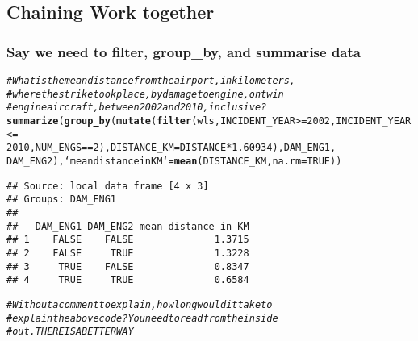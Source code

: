 \documentclass{beamer}\usepackage[]{graphicx}\usepackage[]{color}
\makeatletter
\newcommand{\hlnum}[1]{\textcolor[rgb]{0.686,0.059,0.569}{#1}}%
\newcommand{\hlcom}[1]{\textcolor[rgb]{0.678,0.584,0.686}{\textit{#1}}}%
\newcommand{\hlopt}[1]{\textcolor[rgb]{0,0,0}{#1}}%
\newcommand{\hlstd}[1]{\textcolor[rgb]{0.345,0.345,0.345}{#1}}%
\newcommand{\hlkwc}[1]{\textcolor[rgb]{0.333,0.667,0.333}{#1}}%
\newcommand{\hlkwd}[1]{\textcolor[rgb]{0.737,0.353,0.396}{\textbf{#1}}}%
\newenvironment{kframe}{%
 \def\at@end@of@kframe{}%
 \ifinner\ifhmode%
  \def\at@end@of@kframe{\end{minipage}}%
  \begin{minipage}{\columnwidth}%
 \fi\fi%
 \def\FrameCommand##1{\hskip\@totalleftmargin \hskip-\fboxsep
 \colorbox{shadecolor}{##1}\hskip-\fboxsep
     \hskip-\linewidth \hskip-\@totalleftmargin \hskip\columnwidth}%
 \MakeFramed {\advance\hsize-\width
   \@totalleftmargin\z@ \linewidth\hsize
   \@setminipage}}%
 {\par\unskip\endMakeFramed%
 \at@end@of@kframe}
\newenvironment{knitrout}{}{} %
\makeatother
\begin{document}
\subsection{Chaining Work together}%
\begin{frame}[fragile]
  \frametitle{Say we need to filter, group\_by, and
  summarise data}
\begin{knitrout}\footnotesize
{}\color{fgcolor}\begin{kframe}
\begin{alltt}
\hlcom{# What is the mean distance from the airport, in kilometers,}
\hlcom{# where the strike took place, by damage to engine, on twin}
\hlcom{# engine aircraft, between 2002 and 2010, inclusive?}
\hlkwd{summarize}\hlstd{(}\hlkwd{group_by}\hlstd{(}\hlkwd{mutate}\hlstd{(}\hlkwd{filter}\hlstd{(wls, INCIDENT_YEAR} \hlopt{>=} \hlnum{2002}\hlstd{, INCIDENT_YEAR} \hlopt{<=}
    \hlnum{2010}\hlstd{, NUM_ENGS} \hlopt{==} \hlnum{2}\hlstd{),} \hlkwc{DISTANCE_KM} \hlstd{= DISTANCE} \hlopt{*} \hlnum{1.60934}\hlstd{), DAM_ENG1,}
    \hlstd{DAM_ENG2),} \hlkwc{`mean distance in KM`} \hlstd{=} \hlkwd{mean}\hlstd{(DISTANCE_KM,} \hlkwc{na.rm} \hlstd{=} \hlnum{TRUE}\hlstd{))}
\end{alltt}
\begin{verbatim}
## Source: local data frame [4 x 3]
## Groups: DAM_ENG1
## 
##   DAM_ENG1 DAM_ENG2 mean distance in KM
## 1    FALSE    FALSE              1.3715
## 2    FALSE     TRUE              1.3228
## 3     TRUE    FALSE              0.8347
## 4     TRUE     TRUE              0.6584
\end{verbatim}
\begin{alltt}
\hlcom{# Without a comment to explain, how long would it take to}
\hlcom{# explain the above code?  You need to read from the inside}
\hlcom{# out.  THERE IS A BETTER WAY}
\end{alltt}
\end{kframe}
\end{knitrout}
\end{frame} 
\end{document}
